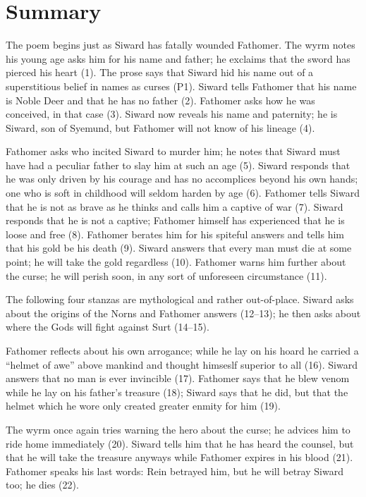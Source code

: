 \section{Summary}

The poem begins just as Siward has fatally wounded Fathomer.  The wyrm notes his young age asks him for his name and father; he exclaims that the sword has pierced his heart (1).  The prose says that Siward hid his name out of a superstitious belief in names as curses (P1).  Siward tells Fathomer that his name is Noble Deer and that he has no father (2).  Fathomer asks how he was conceived, in that case (3).  Siward now reveals his name and paternity; he is Siward, son of Syemund, but Fathomer will not know of his lineage (4).

Fathomer asks who incited Siward to murder him; he notes that Siward must have had a peculiar father to slay him at such an age (5).  Siward responds that he was only driven by his courage and has no accomplices beyond his own hands; one who is soft in childhood will seldom harden by age (6).  Fathomer tells Siward that he is not as brave as he thinks and calls him a captive of war (7).  Siward responds that he is not a captive; Fathomer himself has experienced that he is loose and free (8).  Fathomer berates him for his spiteful answers and tells him that his gold be his death (9).  Siward answers that every man must die at some point; he will take the gold regardless (10).  Fathomer warns him further about the curse; he will perish soon, in any sort of unforeseen circumstance (11).

The following four stanzas are mythological and rather out-of-place.  Siward asks about the origins of the Norns and Fathomer answers (12--13); he then asks about where the Gods will fight against Surt (14--15).

Fathomer reflects about his own arrogance; while he lay on his hoard he carried a “helmet of awe” above mankind and thought himseslf superior to all (16).  Siward answers that no man is ever invincible (17).  Fathomer says that he blew venom while he lay on his father’s treasure (18); Siward says that he did, but that the helmet which he wore only created greater enmity for him (19).

The wyrm once again tries warning the hero about the curse; he advices him to ride home immediately (20).  Siward tells him that he has heard the counsel, but that he will take the treasure anyways while Fathomer expires in his blood (21).  Fathomer speaks his last words: Rein betrayed him, but he will betray Siward too; he dies (22).

